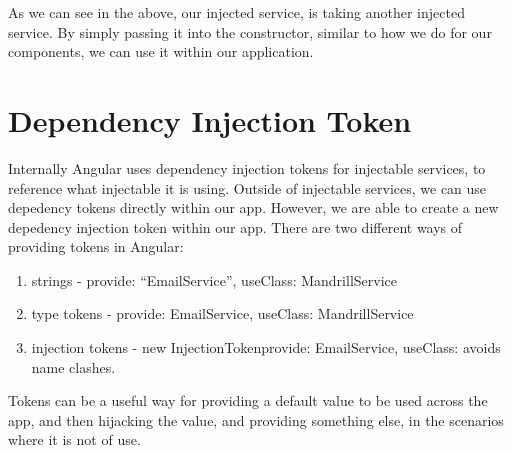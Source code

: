 As we can see in the above, our injected service, is taking another injected
service. By simply passing it into the constructor, similar to how we do for our
components, we can use it within our application.

\section{ Dependency Injection Token }
Internally Angular uses dependency injection tokens for injectable services, to
reference what injectable it is using. Outside of injectable services, we can
use depedency tokens directly within our app. However, we are able to create a
new depedency injection token within our app. There are two different ways of
providing tokens in Angular:
\begin{enumerate}
  \item strings - {provide: ``EmailService'', useClass: MandrillService}
  \item type tokens - {provide: EmailService, useClass: MandrillService}
  \item injection tokens - new InjectionToken{provide: EmailService, useClass:}
  avoids name clashes.
\end{enumerate}

Tokens can be a useful way for providing a default value to be used across the 
app, and then hijacking the value, and providing something else, in the 
scenarios where it is not of use. 
